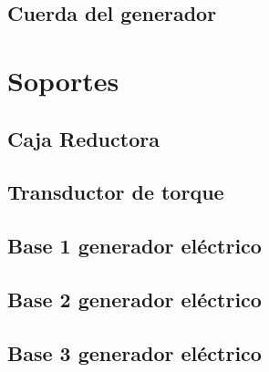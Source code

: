 \subsection{Cuerda del generador}

\section{Soportes}  
\subsection{Caja Reductora} 
\subsection{Transductor de torque} 
\subsection{Base 1 generador eléctrico} 
\subsection{Base 2 generador eléctrico}
\subsection{Base 3 generador eléctrico}




